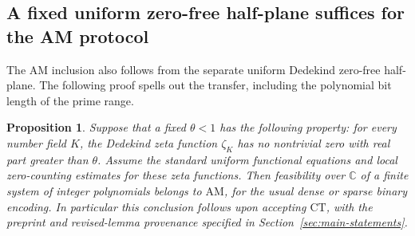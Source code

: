 \documentclass[11pt]{article}
\newtheorem{proposition}[theorem]{Proposition}
\theoremstyle{definition}
\theoremstyle{remark}
\begin{document}
\subsection{A fixed uniform zero-free half-plane suffices for the AM protocol}

The AM inclusion also follows from the separate uniform Dedekind
zero-free half-plane.  The following proof spells out the transfer,
including the polynomial bit length of the prime range.

\begin{proposition}\label{prop:fixed-strip-hn-am}
Suppose that a fixed $\theta<1$ has the following property:
for every number field $K$, the Dedekind zeta function $\zeta_K$
has no nontrivial zero with real part greater than $\theta$.
Assume the standard uniform functional equations and local
zero-counting estimates for these zeta functions.
Then feasibility over $\mathbb C$ of a finite system of integer
polynomials belongs to $\mathrm{AM}$, for the usual dense or
sparse binary encoding. In particular this conclusion follows upon
accepting \(\mathrm{CT}\), with the preprint and revised-lemma
provenance specified in Section~\ref{sec:main-statements}.
\end{proposition}
\end{document}

